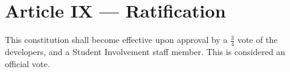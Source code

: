 \documentclass{article}
\begin{document}
  \section{Article IX --- Ratification}
  This constitution shall become effective upon approval by a 
  $\frac{3}{4}$ vote of the developers, and a Student Involvement staff 
  member. This is considered an official vote.
  
\end{document}
